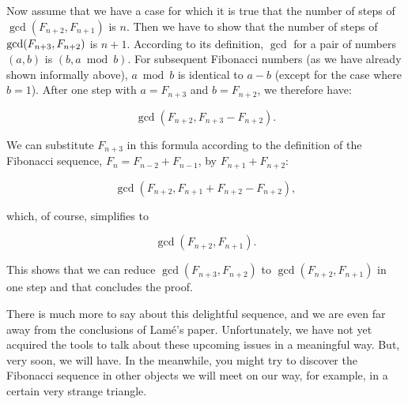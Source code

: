 \documentclass{scrreprt}
\begin{document}
Now assume that we have a case for which it is true
that the number of steps of $\gcd ( F_{n+2}, F_{n+1})$ is $n$.
Then we have to show that 
the number of steps of 
$\gcd ( F_{n+3}, \\ F_{n+2})$ is $n + 1$.
According to its definition, 
$\gcd$ for a pair of numbers $(a,b)$ is $(b, a \bmod  b)$.
For subsequent Fibonacci numbers 
(as we have already shown informally above),
$a \bmod b$ is identical to $a - b$ 
(except for the case where $b = 1$).
After one step 
with $a=F_{n+3}$ and $b=F_{n+2}$, 
we therefore have:

\[
\gcd(F_{n+2}, F_{n+3} - F_{n+2}).
\]

We can substitute $F_{n+3}$ in this formula
according to the definition of the Fibonacci sequence,
$F_{n} = F_{n-2} + F_{n-1}$,
by $F_{n+1} + F_{n+2}$:

\[
\gcd(F_{n+2}, F_{n+1} + F_{n+2} - F_{n+2}),
\]

which, of course, simplifies to

\[
\gcd(F_{n+2}, F_{n+1}).
\]

This shows that we can reduce
$\gcd(F_{n+3}, F_{n+2})$ 
to 
$\gcd(F_{n+2}, F_{n+1})$
in one step
and that concludes the proof.

There is much more to say about 
this delightful sequence,
and we are even far away from the conclusions
of Lamé's paper.
Unfortunately, we have not yet
acquired the tools to talk
about these upcoming issues
in a meaningful way.
But, very soon, we will have.
In the meanwhile,
you might try to discover the Fibonacci sequence
in other objects we will meet on our way,
for example, in a certain very strange triangle.

\end{document}
